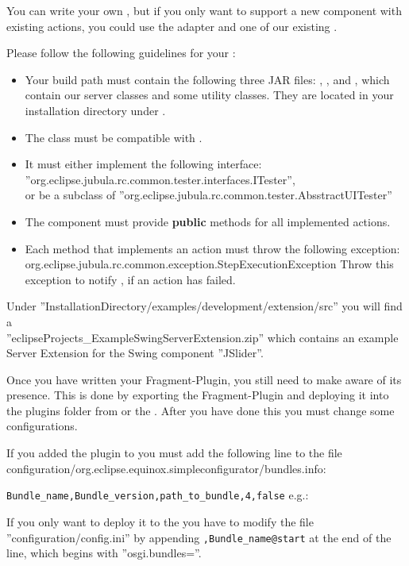You can write your own \gdtesterclasses, but if you only want to support a new
component with existing actions, you could use the adapter and one of our
existing \gdtesterclasses.

Please follow the following guidelines for your \gdtesterclasses:
\begin{itemize}
  \item Your build path must contain the following three JAR files:
  , , and
  , which contain our server classes and some utility classes.
  They are located in your \app{} installation directory under
  .
  \item The class must be compatible with .
  \item It must either implement the following interface: \\
    ''org.eclipse.jubula.rc.common.tester.interfaces.ITester'',\\
	or be a subclass of ''org.eclipse.jubula.rc.common.tester.AbsstractUITester''
  \item The component must provide \textbf{public} methods for all implemented actions.
  \item Each method that implements an action must throw the following exception:
    org.eclipse.jubula.rc.common.exception.StepExecutionException
    Throw this exception to notify \app{}, if an action has failed.
\end{itemize}

Under ''InstallationDirectory/examples/development/extension/src''
you will find a \\ ''eclipseProjects\_ExampleSwingServerExtension.zip'' which contains
 an example \app{} Server Extension for the Swing component ''JSlider''.

Once you have written your Fragment-Plugin, you still need to make \app{}
aware of its presence. This is done by exporting the Fragment-Plugin and
deploying it into the plugins folder from \app{} or the \gdagent.
After you have done this you must change some configurations.

If you added the plugin to \app{} you must add the following line to the file
configuration/org.eclipse.equinox.simpleconfigurator/bundles.info:

\texttt{Bundle\_name,Bundle\_version,path\_to\_bundle,4,false}
e.g.:

If you only want to deploy it to the \gdagent you have to modify
the file ''configuration/config.ini'' by appending
\texttt{,Bundle\_name@start} at the end of the line, which begins with
''osgi.bundles=''.

